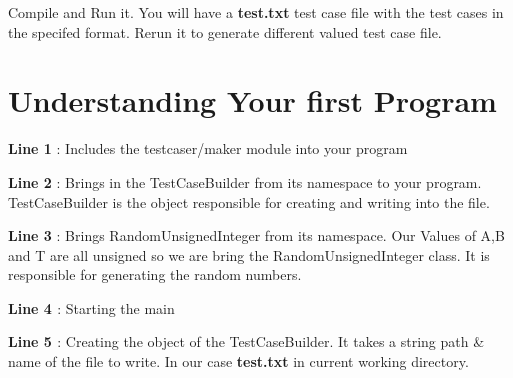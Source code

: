 \begin{DoxyCode}{0}
\DoxyCodeLine{\textcolor{preprocessor}{\#include <testcaser/maker>}}
\DoxyCodeLine{}
\DoxyCodeLine{}
\DoxyCodeLine{}
\DoxyCodeLine{}
\DoxyCodeLine{}
\DoxyCodeLine{\}}
\DoxyCodeLine{}
\DoxyCodeLine{}
\DoxyCodeLine{\}}
\end{DoxyCode}


Compile and Run it. You will have a {\bfseries{test.\+txt}} test case file with the test cases in the specifed format. Rerun it to generate different valued test case file.\hypertarget{index_under_standing}{}\section{Understanding Your first Program}\label{index_under_standing}
{\bfseries{Line 1}} \+: Includes the testcaser/maker module into your program

{\bfseries{Line 2}} \+: Brings in the Test\+Case\+Builder from its namespace to your program. Test\+Case\+Builder is the object responsible for creating and writing into the file.

{\bfseries{Line 3}} \+: Brings Random\+Unsigned\+Integer from its namespace. Our Values of A,B and T are all unsigned so we are bring the Random\+Unsigned\+Integer class. It is responsible for generating the random numbers.

{\bfseries{Line 4 }} \+: Starting the main

{\bfseries{Line 5 }} \+: Creating the object of the Test\+Case\+Builder. It takes a string path \& name of the file to write. In our case {\bfseries{test.\+txt}} in current working directory.

